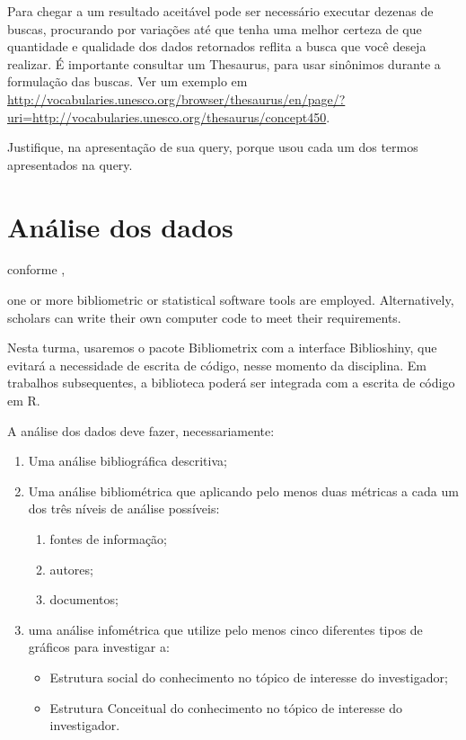 Para chegar a um resultado aceitável pode ser necessário executar dezenas de buscas, procurando por variações até que tenha uma melhor certeza de que quantidade e qualidade dos dados retornados reflita a busca que você deseja realizar.
É importante consultar um Thesaurus, para usar sinônimos durante a formulação das buscas. Ver um exemplo em \url{http://vocabularies.unesco.org/browser/thesaurus/en/page/?uri=http://vocabularies.unesco.org/thesaurus/concept450}.


Justifique, na apresentação de sua query, porque usou cada um dos termos apresentados na query.

\section{Análise dos dados}

conforme \cite{aria_bibliometrix_2017}, 
\begin{itquote}
one or more bibliometric or statistical software tools are employed. Alternatively, scholars can write
their own computer code to meet their requirements.    
\end{itquote}
Nesta turma, usaremos o pacote Bibliometrix com a interface Biblioshiny, que evitará a necessidade de escrita de código, nesse momento da disciplina.
Em trabalhos subsequentes, a biblioteca poderá ser integrada com a escrita de código em R.

A análise dos dados deve fazer, necessariamente:
\begin{enumerate}
    \item Uma análise bibliográfica descritiva;
    \item Uma análise bibliométrica que aplicando pelo menos duas métricas a cada um dos três níveis de análise possíveis:
    \begin{enumerate}
        \item fontes de informação;
        \item autores;
        \item documentos;
    \end{enumerate}
    \item uma análise infométrica que utilize pelo menos cinco diferentes tipos de gráficos para investigar a:
    \begin{itemize}
        \item Estrutura social do conhecimento no tópico de interesse do investigador;
        \item Estrutura Conceitual do conhecimento no tópico de interesse do investigador.
    \end{itemize}
    
\end{enumerate}

